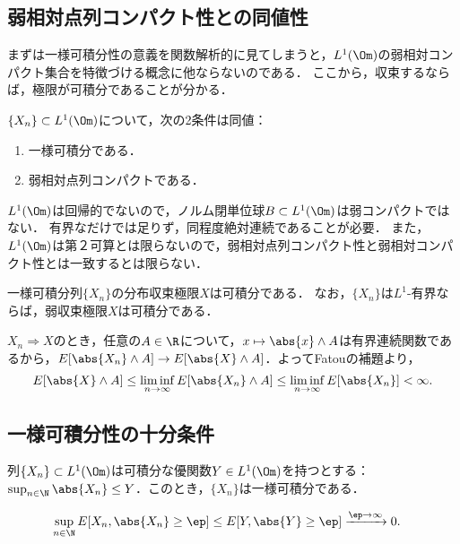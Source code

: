 \documentclass[uplatex,dvipdfmx]{jsreport}
\begin{document}
\subsection{弱相対点列コンパクト性との同値性}

\begin{tcolorbox}[colframe=ForestGreen, colback=ForestGreen!10!white,breakable,colbacktitle=ForestGreen!40!white,coltitle=black,fonttitle=\bfseries\sffamily,
title=]
    まずは一様可積分性の意義を関数解析的に見てしまうと，$L^1(\Om)$の弱相対コンパクト集合を特徴づける概念に他ならないのである．
    ここから，収束するならば，極限が可積分であることが分かる．
\end{tcolorbox}

\begin{theorem}
    $\{X_n\}\subset L^1(\Om)$について，次の2条件は同値：
    \begin{enumerate}
        \item 一様可積分である．
        \item 弱相対点列コンパクトである．
    \end{enumerate}
\end{theorem}
\begin{remarks}
    $L^1(\Om)$は回帰的でないので，ノルム閉単位球$B\subset L^1(\Om)$は弱コンパクトではない．
    有界なだけでは足りず，同程度絶対連続であることが必要．
    また，$L^1(\Om)$は第２可算とは限らないので，弱相対点列コンパクト性と弱相対コンパクト性とは一致するとは限らない．
\end{remarks}

\begin{corollary}[$L^1$-有界集合の分布収束極限は可積分]
    一様可積分列$\{X_n\}$の分布収束極限$X$は可積分である．
    なお，$\{X_n\}$は$L^1$-有界ならば，弱収束極限$X$は可積分である．
\end{corollary}
\begin{Proof}
    $X_n\Rightarrow X$のとき，任意の$A\in\R$について，$x\mapsto\abs{x}\land A$は有界連続関数であるから，$E[\abs{X_n}\land A]\to E[\abs{X}\land A]$．よってFatouの補題より，
    \[E[\abs{X}\land A]\le\liminf_{n\to\infty}E[\abs{X_n}\land A]\le\liminf_{n\to\infty}E[\abs{X_n}]<\infty.\]
\end{Proof}

\subsection{一様可積分性の十分条件}

\begin{proposition}[Lebesgueの優収束定理の前提条件は一様可積分性の十分条件]
    列$\{X_n\}\subset L^1(\Om )$は可積分な優関数$Y\in L^1(\Om)$を持つとする：$\sup_{n\in\N}\abs{X_n}\le Y$．このとき，$\{X_n\}$は一様可積分である．
\end{proposition}
\begin{Proof}
    \begin{align*}
        \sup_{n\in\N}E[X_n,\abs{X_n}\ge\ep]&\le E[Y,\abs{Y}\ge\ep]\xrightarrow{\ep\to\infty}0.
    \end{align*}
\end{Proof}
\end{document}
